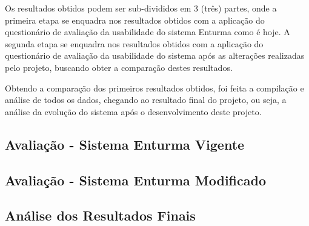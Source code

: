 
Os resultados obtidos podem ser sub-divididos em 3 (três) partes, onde a primeira etapa se enquadra nos resultados obtidos com a aplicação do questionário de avaliação da usabilidade do sistema Enturma como é hoje. A segunda etapa se enquadra nos resultados obtidos com a aplicação do questionário de avaliação da usabilidade do sistema após as alterações realizadas pelo projeto, buscando obter a comparação destes resultados.

Obtendo a comparação dos primeiros resultados obtidos, foi feita a compilação e análise de todos os dados, chegando ao resultado final do projeto, ou seja, a análise da evolução do sistema após o desenvolvimento deste projeto. 

\subsection{Avaliação - Sistema Enturma Vigente} %
\label{sub:avalia_o_sistema_enturma_atual}


\subsection{Avaliação - Sistema Enturma Modificado} %
\label{sub:avalia_o_sistema_enturma_}


\subsection{Análise dos Resultados Finais} %
\label{sub:an_lise_dos_resultados_finais}

